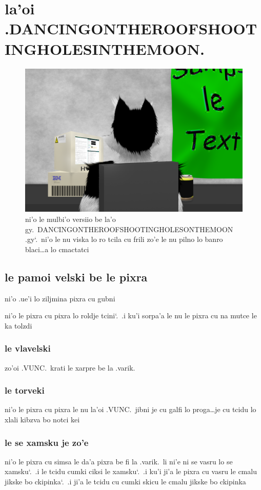 \documentclass{report}
\newcommand\sds{\spacefactor\sfcode`.\ \space}
\begin{document}
\chapter{la'oi .DANCINGONTHEROOFSHOOTINGHOLESINTHEMOON.}
\begin{figure}[ht]
	\centering
	\includegraphics[width=\textwidth]{dancingontheroofshootingholesinthemoon/dancingontheroofshootingholesinthemoon.png}
	\caption[center]{ni'o le mulbi'o versiio be la'o gy.\ DANCINGONTHEROOFSHOOTINGHOLESONTHEMOON .gy\sds  ni'o le nu viska lo ro tcila cu frili zo'e le nu pilno lo banro blaci\ldots a lo cmactatci}
\end{figure}
\section{le pamoi velski be le pixra}
ni'o .ue'i lo ziljmina pixra cu gubni

ni'o le pixra cu pixra lo roldje tcini\sds  .i ku'i sorpa'a le nu le pixra cu na mutce le ka tolzdi

\subsection{le vlavelski}
zo'oi .VUNC.\ krati le xarpre be la .varik.
\subsection{le torveki}
ni'o le pixra cu pixra le nu la'oi .VUNC.\ jibni je cu galfi lo proga\ldots je cu tcidu lo xlali kibzva bo notci kei

\subsection{le se xamsku je zo'e}
ni'o le pixra cu simsa le da'a pixra be fi la .varik.\ li ni'e ni se vasru lo se xamsku\sds  .i le tcidu cumki ciksi le xamsku\sds  .i ku'i ji'a le pixra cu vasru le cmalu jikske bo ckipinka\sds  .i ji'a le tcidu cu cumki skicu le cmalu jikske bo ckipinka
\end{document}
